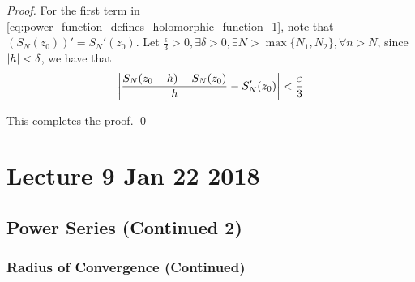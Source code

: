 \documentclass[11pt, oneside]{book}
\begin{document}
\begin{proof}
	For the first term in \cref{eq:power_function_defines_holomorphic_function_1}, note that $(S_N(z_0))' = S_N'(z_0)$. Let $\frac{\epsilon}{3} > 0, \exists \delta > 0, \exists N > \max\{N_1, N_2\}, \forall n > N$, since $\left|h\right| < \delta$, we have that
	\begin{equation*}
		\left|\frac{S_N(z_0 + h) - S_N(z_0)}{h} - S_N'(z_0)\right| < \frac{\varepsilon}{3}
	\end{equation*}

	This completes the proof. \qed
\end{proof}




\chapter{Lecture 9 Jan 22 2018}
	\label{chapter:lecture_9_jan_22_2018}

\section{Power Series (Continued 2)} %
\label{sec:power_series_continued_2}

\subsection{Radius of Convergence (Continued)} %
\label{sub:radius_of_convergence_continued}
\end{document}
